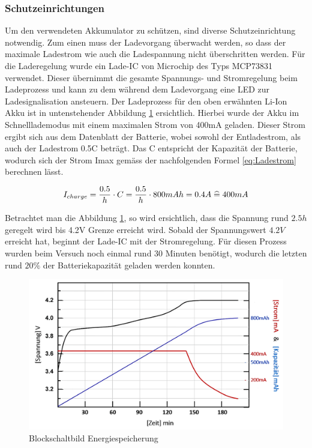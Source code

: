 \subsubsection*{Schutzeinrichtungen}\label{sec:schutzeinrichtung}
Um den verwendeten Akkumulator zu schützen, sind diverse Schutzeinrichtung notwendig. Zum einen muss der Ladevorgang überwacht werden, so dass der maximale Ladestrom wie auch die Ladespannung nicht überschritten werden. Für die Laderegelung wurde ein Lade-IC von Microchip des Typs MCP73831 verwendet. Dieser übernimmt die gesamte Spannungs- und Stromregelung beim Ladeprozess und kann zu dem während dem Ladevorgang eine LED zur Ladesignalisation ansteuern. Der Ladeprozess für den oben erwähnten Li-Ion Akku ist in untenstehender Abbildung  \ref{fig:Ladekurve Li-Ion Akku} ersichtlich. Hierbei wurde der Akku im Schnelllademodus mit einem maximalen Strom von 400mA geladen. Dieser Strom ergibt sich aus dem Datenblatt der Batterie, wobei sowohl der Entladestrom, als auch der Ladestrom 0.5C beträgt. Das C entspricht der Kapazität der Batterie, wodurch sich der Strom Imax gemäss der nachfolgenden Formel \ref{eq:Ladestrom} berechnen lässt.

\begin{equation}
\centering
I_{charge}={\frac{0.5}{h} \cdot C}={\frac{0.5}{h} \cdot 800mAh}=0.4A\thickspace \widehat {=} \thickspace 400mA
\label{eq:Ladestrom}
\end{equation}

Betrachtet man die Abbildung \ref{fig:Ladekurve Li-Ion Akku}, so wird ersichtlich, dass die Spannung rund $2.5h$ geregelt wird bis 4.2V Grenze erreicht wird. Sobald der Spannungswert $4.2V$ erreicht hat, beginnt der Lade-IC mit der Stromregelung. Für diesen Prozess wurden beim Versuch noch einmal rund 30 Minuten benötigt, wodurch die letzten rund $20\%$ der Batteriekapazität geladen werden konnten.

\begin{figure}[H]
	\begin{center}
		\includegraphics[width=120mm]{data/LadekurveLiIon.png}
		\caption[Blockschaltbild Energiespeicherung]{Blockschaltbild Energiespeicherung} %
		\label{fig:Ladekurve Li-Ion Akku}
	\end{center}
\end{figure}


